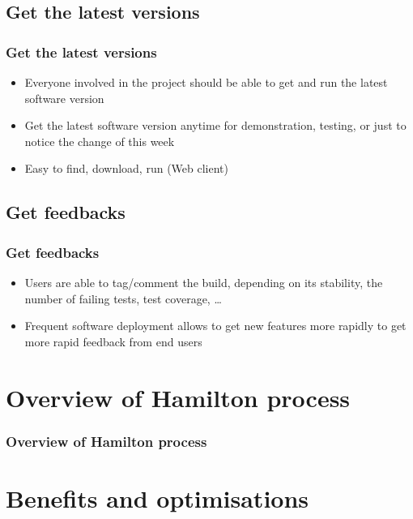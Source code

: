 \documentclass[handout]{beamer}
\begin{document}
\subsection[Get the latest versions]{Get the latest versions}
\begin{frame}
\frametitle{Get the latest versions}

\begin{itemize}
  \item<1-> Everyone involved in the project should be able to get
  and run the latest software version
  \item<2-> Get the latest software version anytime for demonstration, testing,
  or just to notice the change of this week
  \item<3-> Easy to find, download, run (Web client) 
\end{itemize}

\end{frame}


\subsection[Get feedbacks]{Get feedbacks}
\begin{frame}
\frametitle{Get feedbacks}

\begin{itemize}
  \item Users are able to tag/comment the build, depending on its stability,
  the number of failing tests, test coverage, \ldots
  \item Frequent software deployment allows to get new features more rapidly to
  get more rapid feedback\cite{Fowler06} from end users
\end{itemize}

\end{frame}


\section*{Overview of Hamilton process}
\begin{frame}
\frametitle<presentation>{Overview of Hamilton process}

\centering
{}

\end{frame}

\section[Benefits and optimisations]{Benefits and optimisations}
\end{document}
